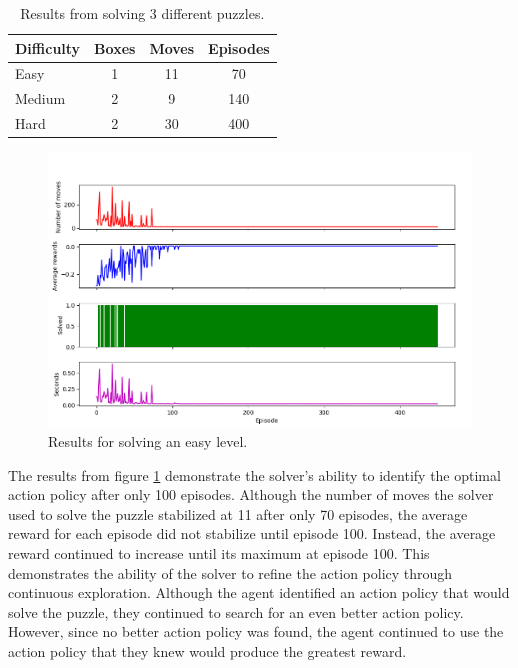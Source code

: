 \documentclass[times, 10pt,twocolumn]{article}
\begin{document}
\begin{table}[htbp]
  \centering
  \begin{tabular}{l c c c} \hline\hline
    Difficulty & Boxes & Moves & Episodes \\ \hline
    Easy & 1 & 11 & 70 \\
    Medium & 2 & 9 & 140 \\
    Hard & 2 & 30 & 400 \\ \hline\hline
  \end{tabular}
  \caption{Results from solving 3 different puzzles.}
  \label{table:results}
\end{table}

\begin{figure}[h] 
  \centering
     \includegraphics[width=\linewidth]{images/easy_graph.png}
  \caption{Results for solving an easy level.}
  \label{fig:e}
\end{figure}

The results from figure \ref{fig:e} demonstrate the solver's ability to identify the optimal action policy after only 100 episodes. Although the number of moves the solver used to solve the puzzle stabilized at 11 after only 70 episodes, the average reward for each episode did not stabilize until episode 100. Instead, the average reward continued to increase until its maximum at episode 100. This demonstrates the ability of the solver to refine the action policy through continuous exploration. Although the agent identified an action policy that would solve the puzzle, they continued to search for an even better action policy. However, since no better action policy was found, the agent continued to use the action policy that they knew would produce the greatest reward.
\end{document}
